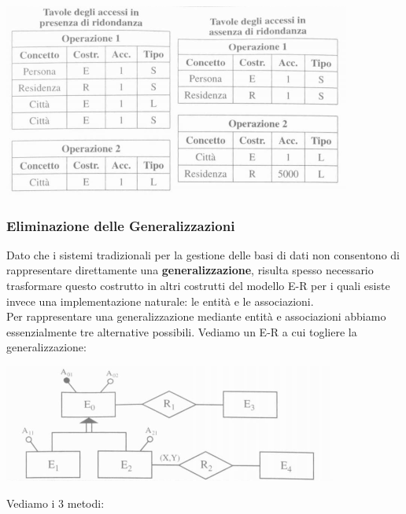 \documentclass[a4paper,12pt, oneside]{book}
\begin{document}
\begin{center}
\includegraphics[scale=1]{img/rid2.png}
\end{center}
\newpage
\subsubsection{Eliminazione delle Generalizzazioni}
Dato che i sistemi tradizionali per la gestione delle basi di dati non consentono
di rappresentare direttamente una \textbf{generalizzazione}, risulta spesso necessario
trasformare questo costrutto in altri costrutti del modello E-R per i quali esiste invece
una implementazione naturale: le entità e le associazioni.\\
Per rappresentare una generalizzazione mediante entità e associazioni
abbiamo essenzialmente tre alternative possibili. Vediamo un E-R a cui togliere la generalizzazione:
\begin{center}
\includegraphics[scale=1]{img/genr.png}
\end{center}
Vediamo i 3 metodi:
\end{document}
